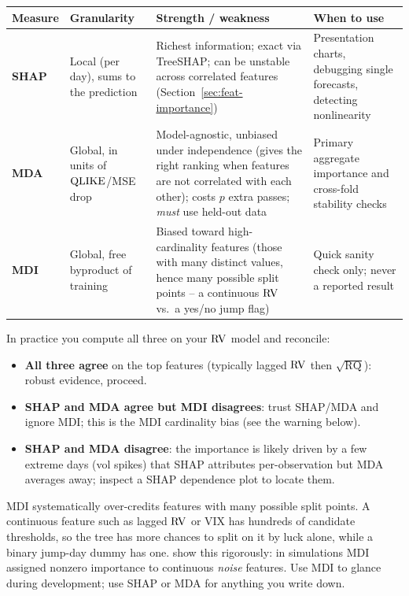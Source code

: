 \begin{center}
\renewcommand{\arraystretch}{1.3}
\begin{tabular}{@{}p{2.0cm}p{2.2cm}p{4.6cm}p{4.4cm}@{}}
\toprule
\textbf{Measure} & \textbf{Granularity} & \textbf{Strength / weakness} & \textbf{When to use} \\
\midrule
\textbf{SHAP}
  & Local (per day), sums to the prediction
  & Richest information; exact via TreeSHAP; can be unstable across
    correlated features (Section~\ref{sec:feat-importance})
  & Presentation charts, debugging single forecasts, detecting
    nonlinearity \\[4pt]
\textbf{MDA}
  & Global, in units of $\operatorname{QLIKE}$/MSE drop
  & Model-agnostic, unbiased under independence (gives the right ranking when
    features are not correlated with each other); costs $p$ extra passes;
    \emph{must} use held-out data
  & Primary aggregate importance and cross-fold stability checks \\[4pt]
\textbf{MDI}
  & Global, free byproduct of training
  & Biased toward high-cardinality features (those with many distinct values,
    hence many possible split points -- a continuous $\operatorname{RV}$ vs.\ a yes/no jump
    flag) \citep{StroblBoulesteixZeileisHothorn2007}
  & Quick sanity check only; never a reported result \\
\bottomrule
\end{tabular}
\end{center}

In practice you compute all three on your $\operatorname{RV}$ model and reconcile:
\begin{itemize}[leftmargin=1.8em]
  \item \textbf{All three agree} on the top features (typically lagged
        $\operatorname{RV}$ then $\sqrt{\operatorname{RQ}}$): robust evidence, proceed.
  \item \textbf{SHAP and MDA agree but MDI disagrees}: trust SHAP/MDA and
        ignore MDI; this is the MDI cardinality bias (see the warning below).
  \item \textbf{SHAP and MDA disagree}: the importance is likely driven by a
        few extreme days (vol spikes) that SHAP attributes per-observation
        but MDA averages away; inspect a SHAP dependence plot to locate
        them.
\end{itemize}

\begin{warning}
MDI systematically over-credits features with many possible split points.
A continuous feature such as lagged $\operatorname{RV}$ or VIX has hundreds of candidate
thresholds, so the tree has more chances to split on it by luck alone, while
a binary jump-day dummy has one.  \citet{StroblBoulesteixZeileisHothorn2007}
show this rigorously: in simulations MDI assigned nonzero importance to
continuous \emph{noise} features.  Use MDI to glance during development; use
SHAP or MDA for anything you write down.
\end{warning}

